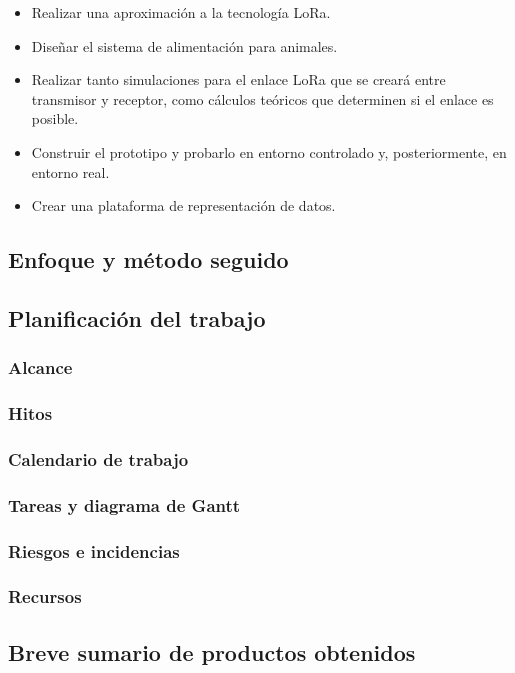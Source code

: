 \documentclass[12pt]{article}
\begin{document}
	\begin{itemize}
		\item Realizar una aproximación a la tecnología LoRa.
		\item Diseñar el sistema de alimentación para animales.
		\item Realizar tanto simulaciones para el enlace LoRa que se creará entre transmisor y receptor, como cálculos teóricos que determinen si el enlace es posible.
		\item Construir el prototipo y probarlo en entorno controlado y, posteriormente, en entorno real.
		\item Crear una plataforma de representación de datos.
	\end{itemize}
	
	\subsection[Enfoque y método seguido]{Enfoque y método seguido}
	\subsection[Planificación del trabajo]{Planificación del trabajo}
	\subsubsection[Alcance]{Alcance}
	\subsubsection[Hitos]{Hitos}	
	\subsubsection[Calendario de trabajo]{Calendario de trabajo}
	\subsubsection[Tareas y diagrama de Gantt]{Tareas y diagrama de Gantt}
	\subsubsection[Riesgos e incidencias]{Riesgos e incidencias}
	\subsubsection[Recursos]{Recursos}
	\subsection[Breve sumario de productos obtenidos]{Breve sumario de productos obtenidos}
\end{document}
